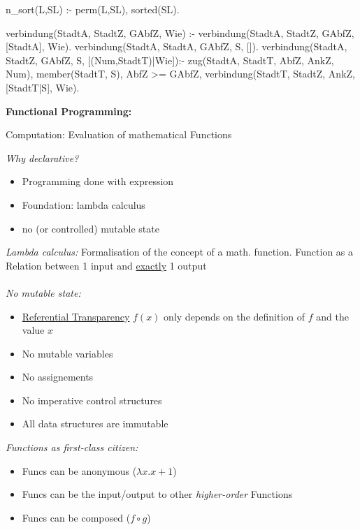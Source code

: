 \begin{breakbox}
\begin{prologcode}

n_sort(L,SL) :- perm(L,SL), sorted(SL).


verbindung(StadtA, StadtZ, GAbfZ, Wie) :-
verbindung(StadtA, StadtZ, GAbfZ, [StadtA], Wie).
verbindung(StadtA, StadtA, GAbfZ, S, []).
verbindung(StadtA, StadtZ, GAbfZ, S, [(Num,StadtT)|Wie]):-
zug(StadtA, StadtT, AbfZ, AnkZ, Num),
\+ member(StadtT, S),
AbfZ >= GAbfZ,
verbindung(StadtT, StadtZ, AnkZ, [StadtT|S], Wie).
\end{prologcode}
\end{breakbox}

\begin{breakbox}
\textbf{Functional Programming:}
\begin{mdframed}
  \begin{center}
  	Computation: Evaluation of mathematical Functions
  \end{center}
\end{mdframed}
\emph{Why declarative?}
\begin{itemize}
	\item Programming done with expression
	\item Foundation: lambda calculus
	\item no (or controlled) mutable state
\end{itemize}
\emph{Lambda calculus:} Formalisation of the concept of a math. function. Function as a Relation between 1 input and \underline{exactly} 1 output \\\\
\emph{No mutable state:}
\begin{itemize}
	\item \underline{Referential Transparency} $f(x)$ only depends on the definition of $f$ and the value $x$
	\item No mutable variables
	\item No assignements
	\item No imperative control structures
	\item All data structures are immutable\\
\end{itemize}
\emph{Functions as first-class citizen:}
\begin{itemize}
	\item Funcs can be anonymous ($\lambda x.x+1$)
	\item Funcs can be the input/output to other \emph{higher-order} Functions
	\item Funcs can be composed ($f \circ g$)
\end{itemize}
\end{breakbox}

